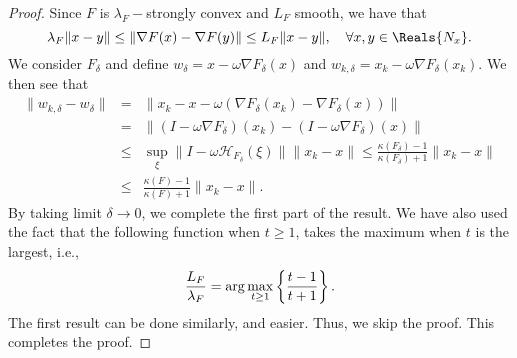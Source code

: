 \begin{proof}
Since $F$ is $\lambda_F-$strongly convex and $L_F$ smooth, we have that
\begin{equation}
\lambda_F \|x - y\| \leq \|\nabla F(x) - \nabla F(y)\| \leq L_F \|x - y\|, \quad \forall x, y \in \Reals{N_x}.  
\end{equation}
We consider $F_\delta$ and define $w_\delta = x - \omega \nabla F_\delta(x)$ and $w_{k,\delta} = x_k - \omega \nabla F_\delta (x_k)$. We then see that 
\begin{eqnarray*} 
\|w_{k,\delta} - w_\delta\| &=& \|x_k - x - \omega (\nabla F_\delta(x_k) - \nabla F_\delta(x)) \| \\ 
&=& \|(I - \omega \nabla F_\delta)(x_k) - (I - \omega \nabla F_\delta)(x)\| \\
&\leq& \sup_{\xi} \|I - \omega \mathcal{H}_{F_\delta}(\xi)\|\|x_k - x\| \leq \frac{\kappa(F_\delta) - 1}{\kappa(F_\delta) + 1} \|x_k - x\| \\
&\leq& \frac{\kappa(F) - 1}{\kappa(F) + 1} \|x_k - x\|.
\end{eqnarray*}
By taking limit $\delta \rightarrow 0$, we complete the first part of the result. We have also used the fact that the following function when $t \geq 1$, takes the maximum when $t$ is the largest, i.e.,   
\begin{eqnarray}
\frac{L_F}{\lambda_F} = {\rm arg}\max_{t \geq 1} \left \{\frac{t - 1}{t + 1} \right \}. 
\end{eqnarray}
The first result can be done similarly, and easier. Thus, we skip the proof. This completes the proof. 
\end{proof}
%
%

